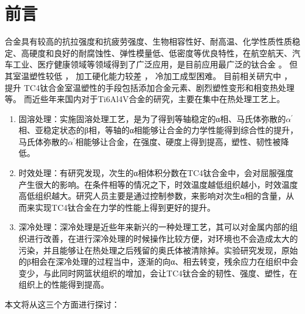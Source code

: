 \documentclass[
class = book,
zihao = -4,
font = noto,
paper = a4paper,
openany
]{easybook}
\newcommand{\ti}{Ti6Al4V}
\begin{document}
	\maketitle
	\frontmatter*[roman]

	\begin{abstract}
		\ti 合金又名TC4合金，拥有较好的塑韧性、耐热性、成形性、耐蚀性等，在机械、军事、航空航天等领域获得了极为广泛的应用。但TC4合金仍存在硬度较低、摩擦磨损系数高、耐磨性能差、较低的塑韧性和力学性能上的各向异性等缺点，制约了其进一步的应用。本文旨在调研固溶时效处理Ti6Al4V合金强度的影响，并分析了不同固溶时效工艺参数下处理Ti6Al4V合金的力学性能，确定了最佳的固溶温度、时效温度、失效时间等参数，为工程应用提供了有价值的参考。
	\end{abstract}

	\tableofcontents
	\mainmatter*
	\pagestyle{Xju}
\chapter{前言}
合金具有较高的抗拉强度和抗疲劳强度、生物相容性好、耐高温、化学性质性质稳定、高硬度和良好的耐腐蚀性、弹性模量低、低密度等优良特性，在航空航天、汽车工业、医疗健康领域等领域得到了广泛应用，是目前应用最广泛的钛合金 。
 但其室温塑性较低 ， 加工硬化能力较差 ， 冷加工成型困难。 目前相关研宄中 ， 提升 TC4钛合金室温塑性的手段包括添加合金元素、剧烈塑性变形和相变热处理等。
 而近些年来国内对于\ti 合金的研究，主要在集中在热处理工艺上\cite{tc42021}。

\begin{enumerate}
	\item 固溶处理：实施固溶处理工艺，是为了得到等轴稳定的α相、马氏体弥散的$ α^{'} $相、亚稳定状态的β相，等轴的α相能够让合金的力学性能得到综合性的提升，马氏体弥散的$ α^{'} $相能够让合金，在强度、硬度上得到提高，塑性、韧性被降低\cite{gurong2002}。
	\item 时效处理：有研究\cite{timing}发现，次生的α相体积分数在TC4钛合金中，会对屈服强度产生很大的影响。在条件相等的情况之下，时效温度越低组织越小，时效温度高低组织越大。研究人员主要是通过控制参数，来影响对次生α相的含量，从而来实现TC4钛合金在力学的性能上得到更好的提升。
	\item 深冷处理：深冷处理是近些年来新兴的一种处理工艺，其可以对金属内部的组织进行改善，在进行深冷处理的时候操作比较方便，对环境也不会造成太大的污染，并且能够让在热处理之后残留的奥氏体被清除掉。实验研究发现，原始的β相会在深冷处理的过程当中，逐渐的向α、相去转变，残余应力在组织中会变少，与此同时网篮状组织的增加，会让TC4钛合金的韧性、强度、塑性，在组织上的性能得到提高。
\end{enumerate}
本文将从这三个方面进行探讨：


\end{document}
